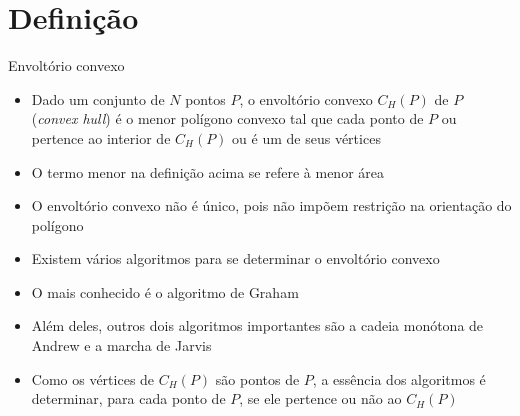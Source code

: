 \section{Definição}

\begin{frame}[fragile]{Envoltório convexo}

    \begin{itemize}
        \item Dado um conjunto de $N$ pontos $P$, o envoltório convexo $C_H(P)$ de $P$
        (\textit{convex hull}) é o menor polígono convexo tal que cada ponto de $P$ 
        ou pertence ao interior de $C_H(P)$ ou é um de seus vértices

        \item O termo menor na definição acima se refere à menor área

        \item O envoltório convexo não é único, pois não impõem restrição na orientação
            do polígono

        \item Existem vários algoritmos para se determinar o envoltório convexo

        \item O mais conhecido é o algoritmo de Graham

        \item Além deles, outros dois algoritmos importantes são a cadeia monótona de
        Andrew e a marcha de Jarvis

        \item Como os vértices de $C_H(P)$ são pontos de $P$, a essência dos algoritmos é 
            determinar, para cada ponto de $P$, se ele pertence ou não ao $C_H(P)$

    \end{itemize}

\end{frame}


